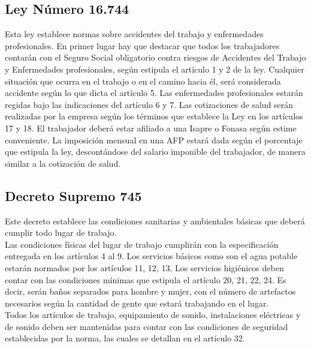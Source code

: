 \subsection*{Ley Número 16.744}
Esta ley establece normas sobre accidentes
del trabajo y enfermedades profesionales.
En primer lugar hay que destacar que todos
los trabajadores contarán con el Seguro
Social obligatorio contra riesgos de Accidentes
del Trabajo y Enfermedades profesionales, según
estipula el artículo 1 y 2 de la ley. Cualquier
situación que ocurra en el trabajo o en el camino
hacia él, será considerada accidente según lo que dicta 
el artículo 5. Las enfermedades profesionales
estarán regidas bajo las indicaciones del artículo 6 y 7.
Las cotizaciones de salud serán realizadas por
la empresa según los términos que establece la Ley
en los artículos 17 y 18. El trabajador deberá
estar afiliado a una Isapre o Fonasa según estime
conveniente. La imposición mensual en una AFP estará
dada según el porcentaje que estipula la ley, descontándose
del salario imponible del trabajador, de manera similar
a la cotización de salud.

\subsection*{Decreto Supremo 745}
Este decreto establece las condiciones sanitarias y 
ambientales básicas que deberá cumplir todo lugar de
trabajo.\\ %


Las condiciones físicas del lugar de trabajo cumplirán
con la especificación entregada en los artículos 4 al 9.
Los servicios básicos como son el agua potable estarán
normados por los artículos 11, 12, 13. Los servicios
higiénicos deben contar con las condiciones mínimas
que estipula el artículo 20, 21, 22, 24. Es decir, serán
baños separados para hombre y mujer, con el número de 
artefactos necesarios según la cantidad de gente que
estará trabajando en el lugar.\\

Todos los artículos de trabajo, equipamiento de sonido, 
instalaciones eléctricas y de sonido deben ser mantenidas
para contar con las condiciones de seguridad establecidas
por la norma, las cuales se detallan en el artículo 32.\\

